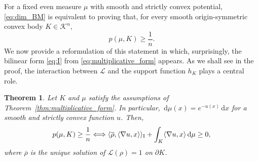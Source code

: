 \documentclass[a4paper, 11pt]{article}
\newcommand{\K}{\mathcal{K}}
\newcommand{\rhobar}{\overline{\rho}}
\newtheorem{theorem}{Theorem}[section]
\theoremstyle{definition}
\newcommand{\di}{\, \mathrm{d}}
\begin{document}
For a fixed even measure $\mu$ with smooth and strictly convex potential, \eqref{eq:dim_BM} is equivalent to proving that, for every smooth origin-symmetric convex body $K \in \K^n$, \[ p(\mu,K) \geq \frac{1}{n}.\] We now provide a reformulation of this statement in which, surprisingly, the bilinear form \eqref{eq:I} from \eqref{eq:multiplicative_form} appears. As we shall see in the proof, the interaction between $\mathcal{L}$ and the support function $h_K$ plays a central role. 
\begin{theorem}\label{thm:reformulation}
    Let $K$ and $\mu$ satisfy the assumptions of Theorem~\ref{thm:multiplicative_form}. In particular, $\di \mu(x)=e^{-u(x)}\di x$ for a smooth and strictly convex function $u$. Then, 
    \begin{equation}\label{eq:equivalent_dim_BM}
        p(\mu,K) \geq \frac{1}{n} \Longleftrightarrow \langle \rhobar,\langle \nabla u, x \rangle \rangle_{\rm I}+\int_K \langle \nabla u, x \rangle \di \mu \geq 0,
    \end{equation}
    where $\rhobar$ is the unique solution of $\mathcal{L}(\rho)=1$ on $\partial K$.
\end{theorem}
\end{document}
